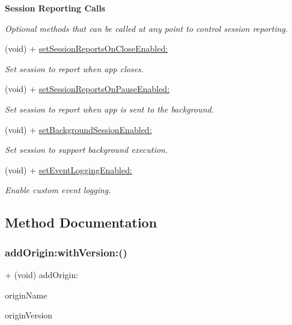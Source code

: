 \begin{Indent}\textbf{ Session Reporting Calls}\par
{\em Optional methods that can be called at any point to control session reporting. }\begin{DoxyCompactItemize}
\item 
(void) + \hyperlink{interfaceFlurry_ad2d1040528d4b57f0d879b2f66162dfe}{set\+Session\+Reports\+On\+Close\+Enabled\+:}
\begin{DoxyCompactList}\small\item\em Set session to report when app closes. \end{DoxyCompactList}\item 
(void) + \hyperlink{interfaceFlurry_a9deea9dd729686c86645ba919fe0776f}{set\+Session\+Reports\+On\+Pause\+Enabled\+:}
\begin{DoxyCompactList}\small\item\em Set session to report when app is sent to the background. \end{DoxyCompactList}\item 
(void) + \hyperlink{interfaceFlurry_a936cba06051ba7a149b988a434d2a05c}{set\+Background\+Session\+Enabled\+:}
\begin{DoxyCompactList}\small\item\em Set session to support background execution. \end{DoxyCompactList}\item 
(void) + \hyperlink{interfaceFlurry_a75fc84e73c7e2d703311991508379407}{set\+Event\+Logging\+Enabled\+:}
\begin{DoxyCompactList}\small\item\em Enable custom event logging. \end{DoxyCompactList}\end{DoxyCompactItemize}
\end{Indent}


\subsection{Method Documentation}
\mbox{\label{interfaceFlurry_a8868284f7deee30fdf767fa9cae4f66d}} 
\subsubsection{\texorpdfstring{add\+Origin\+:with\+Version\+:()}{addOrigin:withVersion:()}}
{\footnotesize\ttfamily + (void) add\+Origin\+: \begin{DoxyParamCaption}\item[{(N\+S\+String $\ast$)}]{origin\+Name }\item[{withVersion:(N\+S\+String $\ast$)}]{origin\+Version }\end{DoxyParamCaption}}



